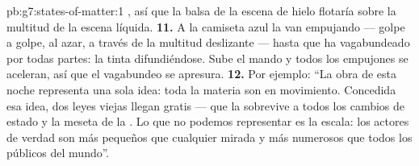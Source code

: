 \begin{solution}{pb:g7:states-of-matter:1}
, así que la balsa de la escena de hielo flotaría sobre
la multitud de la escena líquida.
\textbf{11.} A la camiseta azul la van empujando --- golpe a golpe, al
azar, a través de la multitud deslizante --- hasta que ha vagabundeado
por todas partes: la tinta difundiéndose. Sube el mando y todos los
empujones se aceleran, así que el vagabundeo se apresura.
\textbf{12.} Por ejemplo: ``La obra de esta noche representa una sola
idea: toda la materia son  en movimiento. Concedida esa
idea, dos leyes viejas llegan gratis --- que la  sobrevive a
todos los cambios de estado y la meseta de la . Lo que no
podemos representar es la escala: los actores de verdad son más
pequeños que cualquier mirada y más numerosos que todos los públicos
del mundo''.
\end{solution}
